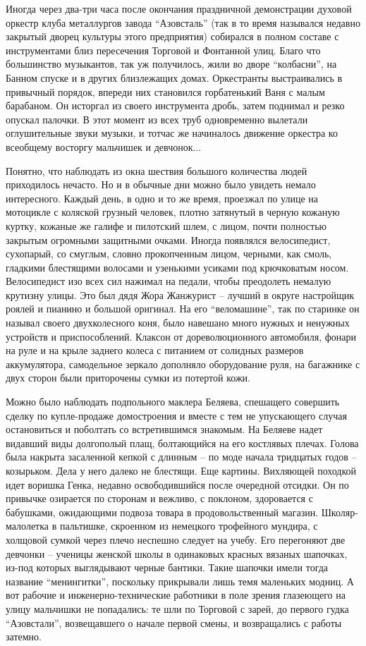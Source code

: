 Иногда через два-три часа после окончания праздничной демонстрации духовой
оркестр клуба металлургов завода \enquote{Азовсталь} (так в то время назывался  недавно
закрытый дворец культуры этого предприятия) собирался в полном составе с
инструментами близ пересечения Торговой и Фонтанной улиц. Благо что большинство
музыкантов, так уж получилось, жили во дворе \enquote{колбасни}, на Банном спуске и в
других близлежащих домах. Оркестранты выстраивались в привычный порядок,
впереди них становился горбатенький Ваня с малым барабаном. Он исторгал из
своего инструмента дробь, затем поднимал и резко опускал палочки. В этот момент
из всех труб одновременно вылетали оглушительные звуки музыки, и тотчас же
начиналось движение оркестра ко всеобщему восторгу мальчишек и девчонок... 

Понятно, что наблюдать из окна шествия большого количества людей приходилось
нечасто. Но и в обычные дни можно было увидеть немало интересного. Каждый день,
в одно и то же время, проезжал по улице на мотоцикле с коляской грузный
человек, плотно затянутый в черную кожаную куртку, кожаные же галифе и
пилотский шлем, с лицом, почти полностью закрытым огромными защитными очками.
Иногда появлялся велосипедист, сухопарый, со смуглым, словно прокопченным
лицом, черными, как смоль, гладкими блестящими волосами и узенькими усиками под
крючковатым носом. Велосипедист изо всех сил нажимал на педали, чтобы
преодолеть немалую крутизну улицы. Это был дядя Жора Жанжурист – лучший в
округе настройщик роялей и пианино и большой оригинал. На его \enquote{веломашине}, так
по старинке он называл своего двухколесного коня, было навешано много нужных и
ненужных устройств и приспособлений. Клаксон от дореволюционного автомобиля,
фонари на руле и на крыле заднего колеса с питанием от солидных размеров
аккумулятора, самодельное зеркало дополняло оборудование руля, на багажнике с
двух сторон были приторочены сумки из потертой кожи.

Можно было наблюдать подпольного маклера Беляева, спешащего совершить сделку по
купле-продаже домостроения и вместе с тем не упускающего случая остановиться и
поболтать со встретившимся знакомым. На Беляеве надет видавший виды долгополый
плащ, болтающийся на его костлявых плечах. Голова была накрыта засаленной
кепкой с длинным – по моде начала тридцатых годов – козырьком. Дела у него
далеко не блестящи. Еще картины. Вихляющей походкой идет воришка Генка, недавно
освободившийся после очередной отсидки. Он по привычке озирается по сторонам и
вежливо, с поклоном, здоровается с бабушками, ожидающими подвоза товара в
продовольственный магазин. Школяр-малолетка в пальтишке, скроенном из немецкого
трофейного мундира, с холщовой сумкой через плечо неспешно следует на учебу.
Его перегоняют две девчонки – ученицы женской школы в одинаковых красных
вязаных шапочках, из-под которых выглядывают черные бантики. Такие шапочки
имели тогда название \enquote{менингитки}, поскольку прикрывали лишь темя маленьких
модниц. А вот рабочие и инженерно-технические работники в поле зрения
глазеющего на улицу мальчишки не попадались: те шли по Торговой с зарей, до
первого гудка \enquote{Азовстали}, возвещавшего о начале первой смены, и возвращались с
работы затемно. 


